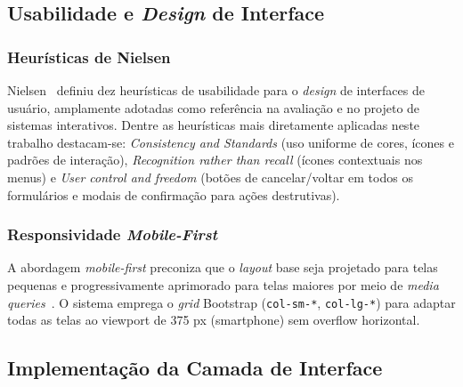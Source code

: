 \subsection{Usabilidade e \textit{Design} de Interface}

\subsubsection{Heurísticas de Nielsen}

Nielsen~\cite{nielsen1994} definiu dez heurísticas de usabilidade para o
\textit{design} de interfaces de usuário, amplamente adotadas como
referência na avaliação e no projeto de sistemas interativos.  Dentre as
heurísticas mais diretamente aplicadas neste trabalho destacam-se:
\textit{Consistency and Standards} (uso uniforme de cores, ícones e padrões
de interação), \textit{Recognition rather than recall} (ícones contextuais
nos menus) e \textit{User control and freedom} (botões de cancelar/voltar
em todos os formulários e modais de confirmação para ações destrutivas).

\subsubsection{Responsividade \textit{Mobile-First}}

A abordagem \textit{mobile-first} preconiza que o \textit{layout} base seja
projetado para telas pequenas e progressivamente aprimorado para telas
maiores por meio de \textit{media queries}~\cite{bootstrap5}.  O sistema
emprega o \textit{grid} Bootstrap (\texttt{col-sm-*}, \texttt{col-lg-*})
para adaptar todas as telas ao viewport de 375 px (smartphone) sem overflow
horizontal.



\subsection{Implementação da Camada de Interface}

